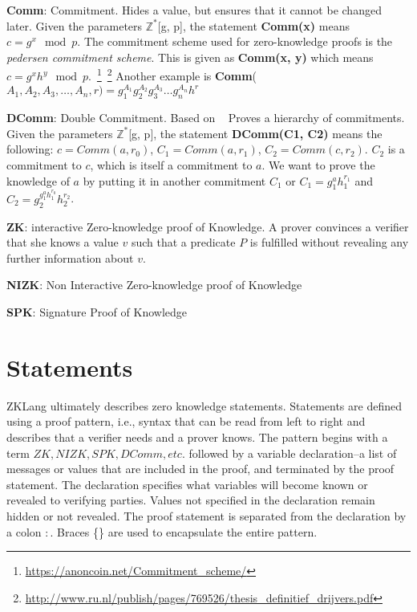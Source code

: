 \documentclass[a4paper]{article}
\begin{document}
\textbf{Comm}: Commitment. Hides a value, but ensures that it cannot be changed later. Given the parameters $\mathbb{Z^*}$[g, p], the statement \textbf{Comm(x)} means  $c=g^x\mod{p}$. The commitment scheme used for zero-knowledge proofs is the \emph{pedersen commitment scheme}. This is given as \textbf{Comm(x, y)} which means $c=g^xh^y\mod{p}$.~\footnote{\url{https://anoncoin.net/Commitment_scheme/}}~\footnote{\url{http://www.ru.nl/publish/pages/769526/thesis_definitief_drijvers.pdf}} Another example is \textbf{Comm}($A_1, A_2, A_3, \dots, A_n, r)=g_1^{A_1} g_2^{A_2} g_3^{A_3}\dots g_n^{A_n} h^r$\newline

\textbf{DComm}: Double Commitment. Based on ~\cite[Appendix]{MiersG0R13} Proves a hierarchy of commitments. Given the parameters $\mathbb{Z^*}$[g, p], the statement \textbf{DComm(C1, C2)} means the following:
$c=Comm(a, r_0)$, $C_1=Comm(a, r_1)$, $C_2=Comm(c, r_2)$. $C_2$ is a commitment to $c$, which is itself a commitment to $a$. We want to prove the knowledge of $a$ by putting it in another commitment $C_1$ or $C_1 = g_1^a h_1^{r_1}$ and $C_2 = g_2^{g_1^{a} h_1^{r_0}} h_2^{r_2}$.\newline

\textbf{ZK}: interactive Zero-knowledge proof of Knowledge. A prover convinces a verifier that she knows a value $v$ such that a predicate $P$ is fulfilled without revealing any further information about $v$.\newline

\textbf{NIZK}: Non Interactive Zero-knowledge proof of Knowledge\newline

\textbf{SPK}: Signature Proof of Knowledge\newline

\section{Statements}
ZKLang ultimately describes zero knowledge statements. Statements are defined using a proof pattern, i.e., syntax that can be read from left to right and describes that a verifier needs and a prover knows. The pattern begins with a term $ZK, NIZK, SPK, DComm, etc.$ followed by a variable declaration--a list of messages or values that are included in the proof, and terminated by the proof statement. 
The declaration specifies what variables will become known or revealed to verifying parties. Values not specified in the declaration remain hidden or not revealed. The proof statement is separated from the declaration by a colon $:$. Braces \{\} are used to encapsulate the entire pattern.
\end{document}
